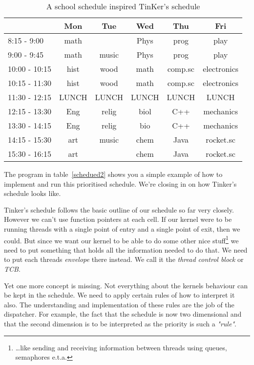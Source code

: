 \begin{table}[!hbp]
\begin{tabular}{|l|c|c|c|c|c|}
\hline
		& Mon 	& Tue	& Wed	& Thu	& Fri\\ \hline
 8:15 -  9:00 	& math	&	& Phys	& prog	& play\\
 9:00 -  9:45 	& math	& music	& Phys	& prog	& play\\
10:00 - 10:15 	& hist	& wood	& math	& comp.sc	& electronics\\
10:15 - 11:30 	& hist	& wood	& math	& comp.sc	& electronics\\ \hline
11:30 - 12:15 	& LUNCH	& LUNCH	& LUNCH	& LUNCH	& LUNCH\\ \hline
12:15 - 13:30 	& Eng	& relig	& biol	& C++	& mechanics\\
13:30 - 14:15 	& Eng	& relig	& bio	& C++	& mechanics\\
14:15 - 15:30 	& art	& music	& chem	& Java	& rocket.sc\\
15:30 - 16:15 	& art	&	& chem	& Java	& rocket.sc\\ \hline
\end{tabular}
\caption{A school schedule inspired TinKer's schedule}\label{school_schedule}
\end{table}


The program in table~\ref{schedued2} shows you a simple example of how to implement and run this prioritised schedule. We're closing in on how Tinker's schedule looks like. 

Tinker's schedule follows the basic outline of our schedule so far very closely. However we can't use function pointers at each cell. If our kernel were to be running threads with a single point of entry and a single point of exit, then we could. But since we want our kernel to be able to do some other nice stuff\footnote{\ldots{}like sending and receiving information between threads using queues, semaphores e.t.a.} we need to put something that holds all the information needed to do that. We need to put each threads \textit{envelope} there instead. We call it the \textit{thread control block} or \textit{TCB}.

Yet one more concept is missing. Not everything about the kernels behaviour can be kept in the schedule. We need to apply certain rules of how to interpret it also. The understanding and implementation of these rules are the job of the dispatcher. For example, the fact that the schedule is now two dimensional and that the second dimension is to be interpreted as the priority is such a \textit{"rule"}. 

